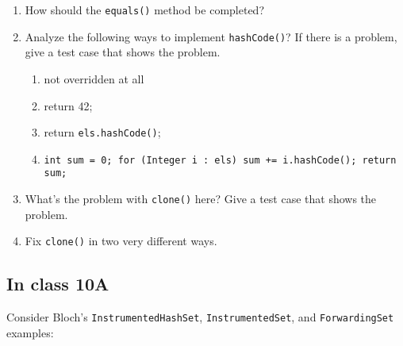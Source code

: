 \documentclass[11pt]{article}
\begin{document}
\begin{enumerate}
\item How should the \texttt{equals()} method be completed?
\item Analyze the following ways to implement \texttt{hashCode()}? If there is a problem, give a test case that shows the problem.
\begin{enumerate}
\item not overridden at all
\item return 42;
\item return \texttt{els.hashCode()};
\item \texttt{int sum = 0; for (Integer i : els) sum += i.hashCode(); return sum;}
\end{enumerate}
\item What's the problem with \texttt{clone()} here? Give a test case that shows the problem.
\item Fix \texttt{clone()} in two very different ways.
\end{enumerate}

\subsection{In class 10A}
\label{sec:orgbbdf573}
Consider Bloch's \texttt{InstrumentedHashSet}, \texttt{InstrumentedSet}, and \texttt{ForwardingSet} examples:
\end{document}
